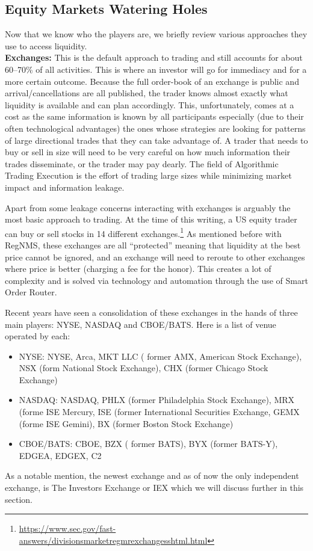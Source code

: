 \subsection{Equity Markets Watering Holes}


Now that we know who the players are, we briefly review various approaches they use to access liquidity. \\

\noindent\textbf{Exchanges:} This is the default approach to trading and still accounts for about 60--70\% of all activities. This is where an investor will go for immediacy and for a more certain outcome. Because the full order-book of an exchange is public and arrival/cancellations are all published, the trader knows almost exactly what liquidity is available and can plan accordingly. This, unfortunately, comes at a cost as the same information is known by all participants especially (due to their often technological advantages) the ones whose strategies are looking for patterns of large directional trades that they can take advantage of. A trader that needs to buy or sell in size will need to be very careful on how much information their trades disseminate, or the trader may pay dearly. The field of Algorithmic Trading Execution is the effort of trading large sizes while minimizing market impact and information leakage. 


Apart from some leakage concerns interacting with exchanges is arguably the most basic approach to trading. At the time of this writing, a US equity trader can buy or sell stocks in 14 different exchanges.\footnote{\url{https://www.sec.gov/fast-answers/divisionsmarketregmrexchangesshtml.html}} As mentioned before with RegNMS, these exchanges are all ``protected'' meaning that liquidity at the best price cannot be ignored, and an exchange will need to reroute to other exchanges where price is better (charging a fee for the honor). This creates a lot of complexity and is solved via technology and automation through the use of Smart Order Router.


Recent years have seen a consolidation of these exchanges in the hands of three main players: NYSE, NASDAQ and CBOE/BATS. Here is a list of venue operated by each:
        \begin{itemize}
        \item NYSE: NYSE, Arca, MKT LLC ( former AMX, American Stock Exchange), NSX (form National Stock Exchange), CHX (former Chicago Stock Exchange)
        \item NASDAQ:  NASDAQ, PHLX (former Philadelphia Stock Exchange), MRX (forme ISE Mercury, ISE (former International Securities Exchange, GEMX (forme ISE Gemini), BX (former Boston Stock Exchange)
        \item CBOE/BATS: CBOE, BZX ( former BATS), BYX (former BATS-Y), EDGEA, EDGEX, C2
        \end{itemize}
As a notable mention, the newest exchange and as of now the only independent exchange, is The Investors Exchange or IEX which we will discuss further in this section.


